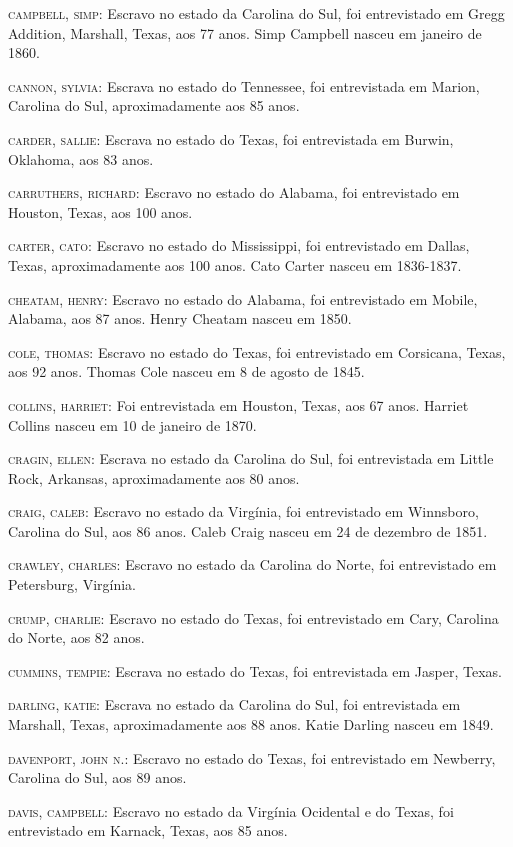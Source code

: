 \begin{Parskip}
\textsc{campbell, simp:} Escravo no estado da Carolina do Sul, foi
entrevistado em Gregg Addition, Marshall, Texas, aos 77 anos. Simp
Campbell nasceu em janeiro de 1860.

\textsc{cannon, sylvia:} Escrava no estado do Tennessee, foi
entrevistada em Marion, Carolina do Sul, aproximadamente aos 85 anos.

\textsc{carder, sallie:} Escrava no estado do Texas, foi entrevistada em
Burwin, Oklahoma, aos 83 anos.

\textsc{carruthers, richard:} Escravo no estado do Alabama, foi
entrevistado em Houston, Texas, aos 100 anos.

\textsc{carter, cato:} Escravo no estado do Mississippi, foi
entrevistado em Dallas, Texas, aproximadamente aos 100 anos. Cato Carter
nasceu em 1836-1837.

\textsc{cheatam, henry:} Escravo no estado do Alabama, foi entrevistado
em Mobile, Alabama, aos 87 anos. Henry Cheatam nasceu em 1850.

\textsc{cole, thomas:} Escravo no estado do Texas, foi entrevistado em
Corsicana, Texas, aos 92 anos. Thomas Cole nasceu em 8 de agosto de
1845.

\textsc{collins, harriet:} Foi entrevistada em Houston, Texas, aos 67
anos. Harriet Collins nasceu em 10 de janeiro de 1870.

\textsc{cragin, ellen:} Escrava no estado da Carolina do Sul, foi
entrevistada em Little Rock, Arkansas, aproximadamente aos 80 anos.

\textsc{craig, caleb:} Escravo no estado da Virgínia, foi entrevistado
em Winnsboro, Carolina do Sul, aos 86 anos. Caleb Craig nasceu em 24 de
dezembro de 1851.

\textsc{crawley, charles:} Escravo no estado da Carolina do Norte, foi
entrevistado em Petersburg, Virgínia.

\textsc{crump, charlie:} Escravo no estado do Texas, foi entrevistado em
Cary, Carolina do Norte, aos 82 anos.

\textsc{cummins, tempie:} Escrava no estado do Texas, foi entrevistada
em Jasper, Texas.

\textsc{darling, katie:} Escrava no estado da Carolina do Sul, foi
entrevistada em Marshall, Texas, aproximadamente aos 88 anos. Katie
Darling nasceu em 1849.

\textsc{davenport, john n.:} Escravo no estado do Texas, foi
entrevistado em Newberry, Carolina do Sul, aos 89 anos.

\textsc{davis, campbell:} Escravo no estado da Virgínia Ocidental e do
Texas, foi entrevistado em Karnack, Texas, aos 85 anos.


\end{Parskip}
